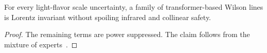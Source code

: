\begin{proposition}[Resummation]\label{thm:1}
For every light-flavor scale uncertainty, a family of transformer-based
Wilson lines is Lorentz invariant without spoiling infrared and
collinear safety.
\end{proposition}

\begin{proof}
The remaining terms are power suppressed. The claim follows from the
mixture of
experts~\cite{TPC:1234-QUASAR-Quark-Initiated-Unsupervised-Anomalous-Spectral-Adaptive-Representations-September-20-2026}.
\end{proof}

